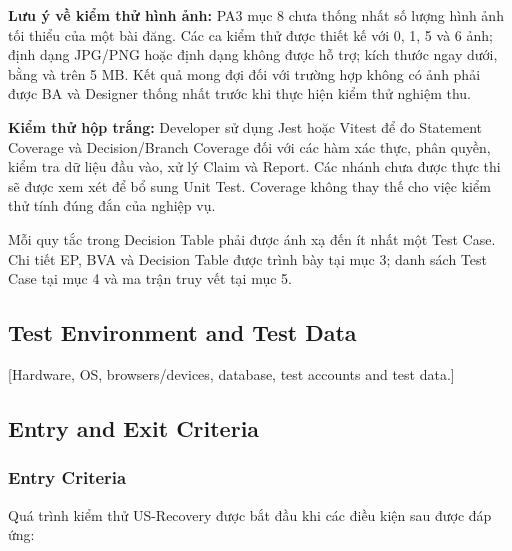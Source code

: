 \noindent\textbf{Lưu ý về kiểm thử hình ảnh:}
PA3 mục 8 chưa thống nhất số lượng hình ảnh tối thiểu 
của một bài đăng. Các ca kiểm thử được thiết kế với 
0, 1, 5 và 6 ảnh; định dạng JPG/PNG hoặc định dạng 
không được hỗ trợ; kích thước ngay dưới, bằng và trên 
5 MB. Kết quả mong đợi đối với trường hợp không có 
ảnh phải được BA và Designer thống nhất trước khi 
thực hiện kiểm thử nghiệm thu.

\medskip

\noindent\textbf{Kiểm thử hộp trắng:}
Developer sử dụng Jest hoặc Vitest để đo Statement 
Coverage và Decision/Branch Coverage đối với các 
hàm xác thực, phân quyền, kiểm tra dữ liệu đầu vào, 
xử lý Claim và Report. Các nhánh chưa được thực thi 
sẽ được xem xét để bổ sung Unit Test. Coverage không 
thay thế cho việc kiểm thử tính đúng đắn của nghiệp vụ.

Mỗi quy tắc trong Decision Table phải được ánh xạ 
đến ít nhất một Test Case. Chi tiết EP, BVA và Decision 
Table được trình bày tại mục 3; danh sách Test Case 
tại mục 4 và ma trận truy vết tại mục 5.

\subsection{Test Environment and Test Data}

[Hardware, OS, browsers/devices, database, test accounts and test data.]

\subsection{Entry and Exit Criteria}

\subsubsection*{Entry Criteria}

Quá trình kiểm thử US-Recovery được bắt đầu khi 
các điều kiện sau được đáp ứng:

